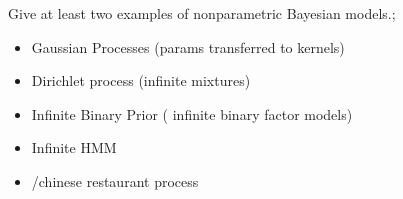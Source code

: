 \documentclass{article}
\begin{document}
Give at least two examples of nonparametric Bayesian models.; \begin{itemize} \item Gaussian Processes (params transferred to kernels) \item Dirichlet process (infinite mixtures) \item Infinite Binary Prior ( infinite binary factor models) \item Infinite HMM \item /chinese restaurant process \end{itemize}
\end{document}
